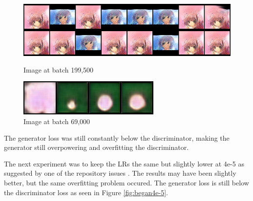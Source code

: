 \documentclass{article} %
\begin{document}
\begin{figure}[h!]
	\begin{minipage}{0.49\linewidth}
		\centering
		\includegraphics[width=0.95\linewidth]{sami-199500_G.png}	
		\caption{Image at batch 199,500}
		\label{fig:beganGen199k}
	\end{minipage}
	\begin{minipage}{0.49\linewidth}
		\centering
		\includegraphics[width=0.95\linewidth]{sami-69000_G.png}
		\caption{Image at batch 69,000}
		\label{fig:beganGen69k}
	\end{minipage}
\end{figure}

The generator loss was still constantly below the discriminator, making the generator still overpowering and overfitting the discriminator.

The next experiment was to keep the LRs the same but slightly lower at 4e-5 as suggested by one of the repository issues \cite{kimBEGAN-30}. The results may have been slightly better, but the same overfitting problem occured.  The generator loss is still below the discriminator loss as seen in Figure \ref{fig:began4e-5}.
\end{document}

